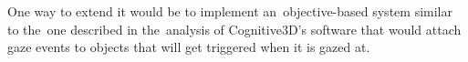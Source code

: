 \documentclass[english,bachelor,unicode]{ctufit-thesis}
\theoremstyle{plain}
\theoremstyle{definition}
\theoremstyle{remark}
\numberwithin{theorem}{chapter}
\begin{document}
One way to extend it would be to implement an~objective-based system similar to the~one described in the~analysis of Cognitive3D's software that would attach gaze events to objects that will get triggered when it is gazed at. 
\appendix\appendixinit %


\backmatter %

\printbibliography %

\end{document}
